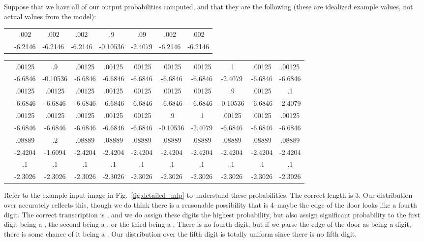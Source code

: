 \documentclass{article} \usepackage{comment}
\begin{document}
Suppose that we have all of our output probabilities computed, and that they
are the following (these are idealized example values, not actual values from the model):

\begin{tabular} {c|c|c|c|c|c|c|c}
&  &  &  &  &  &  &  \\
\hline
 & .002 & .002 & .002 & .9 & .09 & .002 & .002 \\
\hline
 & -6.2146 & -6.2146 & -6.2146 & -0.10536 & -2.4079 & -6.2146 & -6.2146
\end{tabular}

{\tiny
\begin{tabular} {c|c|c|c|c|c|c|c|c|c|c}
&  &  &  &  &  &  &  &  &  &  \\
\hline
 & .00125 & .9 & .00125 & .00125 & .00125 & .00125 & .00125 & .1 & .00125 & .00125 \\
\hline
 & -6.6846 & -0.10536 & -6.6846 & -6.6846 & -6.6846 & -6.6846 & -6.6846 & -2.4079 & -6.6846 & -6.6846 \\
\hline
      & .00125  & .00125   & .00125  & .00125  & .00125  & .00125  & .00125  & .9 & .00125 & .1 \\
\hline
 & -6.6846 & -6.6846 & -6.6846 & -6.6846 & -6.6846 & -6.6846 & -6.6846 & -0.10536 & -6.6846 & -2.4079 \\
\hline
     & .00125   & .00125  & .00125  & .00125  & .00125  & .9     & .1       & .00125   & .00125 & .00125 \\
\hline
 & -6.6846 & -6.6846 & -6.6846 & -6.6846 & -6.6846 & -0.10536 & -2.4079 & -6.6846 & -6.6846 & -6.6846 \\
\hline
 & .08889 & .2 & .08889 & .08889 & .08889 & .08889 & .08889 & .08889 & .08889 & .08889 \\
\hline
 & -2.4204 & -1.6094  & -2.4204  & -2.4204  & -2.4204  & -2.4204  & -2.4204  & -2.4204  & -2.4204  & -2.4204 \\
\hline
 & .1 & .1 & .1 & .1 & .1 & .1 & .1 & .1 & .1 & .1 \\
\hline
 & -2.3026 & -2.3026 & -2.3026 & -2.3026 & -2.3026 & -2.3026 & -2.3026 & -2.3026 & -2.3026 & -2.3026
\end{tabular}
}

Refer to the example input image in Fig.~\ref{fig:detailed_mlp} to understand these probabilities. The correct length is 3.
Our distribution over  accurately reflects this, though we do think there is a reasonable possibility that  is 4--maybe
the edge of the door looks like a fourth digit. The correct transcription is , and we do assign these digits the
highest probability, but also assign significant probability to the first digit being a , the second being a , or the third
being a . There is no fourth digit, but if we parse the edge of the door as being a digit, there is some chance of it being a .
Our distribution over the fifth digit is totally uniform since there is no fifth digit.
\end{document}

